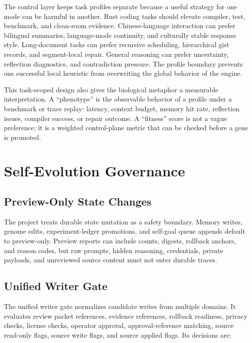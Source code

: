 \documentclass[10pt]{article}
\begin{document}
The control layer keeps task profiles separate because a useful strategy for
one mode can be harmful in another. Rust coding tasks should elevate compiler,
test, benchmark, and clean-room evidence. Chinese-language interaction can
prefer bilingual summaries, language-mode continuity, and culturally stable
response style. Long-document tasks can prefer recursive scheduling,
hierarchical gist records, and segment-local repair. General reasoning can
prefer uncertainty, reflection diagnostics, and contradiction pressure. The
profile boundary prevents one successful local heuristic from overwriting the
global behavior of the engine.

This task-scoped design also gives the biological metaphor a measurable
interpretation. A ``phenotype'' is the observable behavior of a profile under a
benchmark or trace replay: latency, context budget, memory hit rate, reflection
issues, compiler success, or repair outcome. A ``fitness'' score is not a vague
preference; it is a weighted control-plane metric that can be checked before a
gene is promoted.

\section{Self-Evolution Governance}

\subsection{Preview-Only State Changes}

The project treats durable state mutation as a safety boundary. Memory writes,
genome edits, experiment-ledger promotions, and self-goal queue appends default
to preview-only. Preview reports can include counts, digests, rollback anchors,
and reason codes, but raw prompts, hidden reasoning, credentials, private
payloads, and unreviewed source content must not enter durable traces.

\subsection{Unified Writer Gate}

The unified writer gate normalizes candidate writes from multiple domains. It
evaluates review packet references, evidence references, rollback readiness,
privacy checks, license checks, operator approval, approval-reference matching,
source read-only flags, source write flags, and source applied flags. Its
decisions are:
\end{document}
